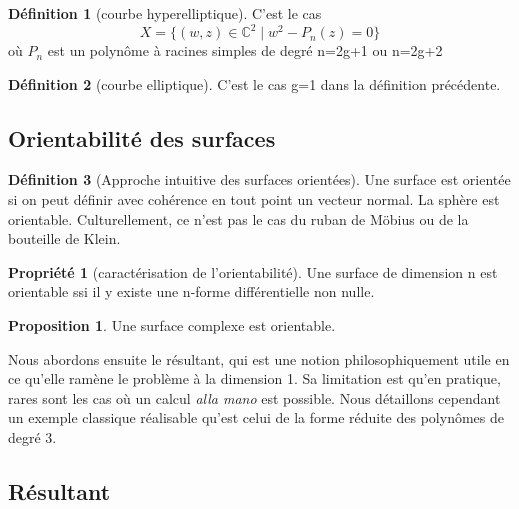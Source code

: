 \documentclass{article}
\newcommand{\C}{\mathbb{C}} %
\theoremstyle{definition} %
\newtheorem{defi}{Définition}
\newtheorem{prop}{Proposition}
\newtheorem{propri}{Propriété}
\newcommand{\1}{\mathbb{1}} %
\begin{document}
\begin{defi}[courbe hyperelliptique]
C'est le cas
$$X=\{(w,z) \in \C^2 \mid w^2 - P_n(z) = 0\}$$
où $P_n$ est un polynôme à racines simples de degré n=2g+1 ou n=2g+2
\end{defi}

\begin{defi}[courbe elliptique]
C'est le cas g=1 dans la définition précédente.
\end{defi}

\subsection{Orientabilité des surfaces}

\begin{defi}[Approche intuitive des surfaces orientées]
Une surface est orientée si on peut définir avec cohérence en tout point un vecteur normal. La sphère est orientable. Culturellement, ce n'est pas le cas du ruban de Möbius ou de la bouteille de Klein.
\end{defi}

\begin{propri}[caractérisation de l'orientabilité]
Une surface de dimension n est orientable ssi il y existe une n-forme différentielle non nulle.
\end{propri}

\begin{prop}
Une surface complexe est orientable.
\end{prop}



Nous abordons ensuite le résultant, qui est une notion philosophiquement utile en ce qu'elle ramène le problème à la dimension 1.
Sa limitation est qu'en pratique, rares sont les cas où un calcul \textit{alla mano} est possible. Nous détaillons cependant un exemple classique réalisable qu'est celui de la forme réduite des polynômes de degré 3.

\subsection{Résultant}
\end{document}
